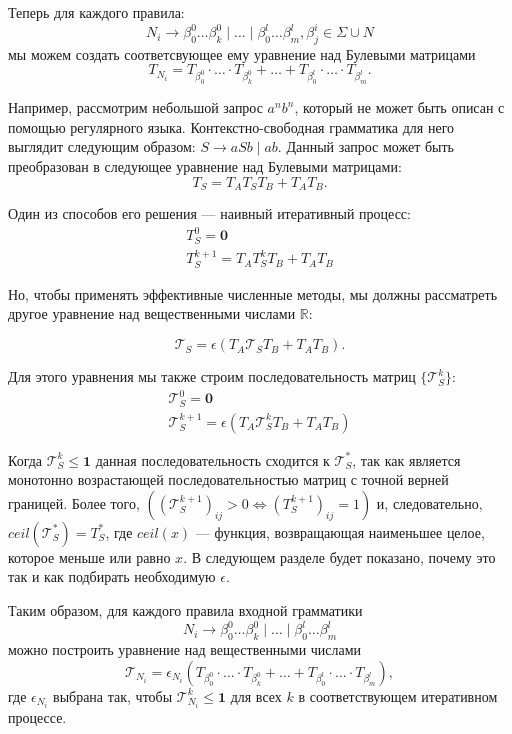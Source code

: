 \documentclass[12pt]{matmex-diploma-custom}
\begin{document}
Теперь для каждого правила:
$$N_i \to \beta^0_0 \dots \beta^0_k \mid \ldots \mid \beta^l_0 \dots \beta^l_m, \beta^i_j \in \Sigma \cup N$$
мы можем создать соответсвующее ему уравнение над Булевыми матрицами
$$T_{N_i} = T_{\beta^0_0}\cdot \ldots \cdot T_{\beta^0_k} + \ldots + T_{\beta^l_0}\cdot \ldots \cdot T_{\beta^l_m}.$$

Например, рассмотрим небольшой запрос $a^nb^n$, который не может быть описан с помощью регулярного языка. Контекстно-свободная грамматика для него выглядит следующим образом: $S \rightarrow aSb \mid ab$. 
Данный запрос может быть преобразован в следующее уравнение над Булевыми матрицами:
\begin{equation}
    T_S = T_AT_ST_B + T_AT_B.
\label{eqbool}
\end{equation}

Один из способов его решения --- наивный итеративный процесс:
\begin{gather*} 
T_S^0 = \mathbf{0} \\
T_S^{k+1} = T_A T_S^k T_B + T_A T_B
\end{gather*} 

Но, чтобы применять эффективные численные методы, мы должны рассматреть другое уравнение над вещественными числами $\mathbb{R}$:

$$\mathcal{T}_S = \epsilon(T_A \mathcal{T}_S T_B + T_A T_B).$$

Для этого уравнения мы также строим последовательность матриц $\{ \mathcal{T}_S^{k}\}$: 
\begin{gather*} 
\mathcal{T}_S^0 = \mathbf{0} \\
\mathcal{T}_S^{k+1} = \epsilon(T_A \mathcal{T}_S^k T_B + T_A T_B)
\end{gather*} 

Когда  $\mathcal{T}_S^{k} \leq \textbf{1}$ данная последовательность сходится к $\mathcal{T}_S^*$, так как является монотонно возрастающей последовательностью матриц с точной верней границей.
Более того, $((\mathcal{T}_S^{k+1})_{ij} > 0 \Leftrightarrow (T_S^{k+1})_{ij} = 1)$ и, следовательно, $ceil(\mathcal{T}_S^*) = T_S^*$, где $ceil(x)$ --- функция, возвращающая наименьшее целое, которое меньше или равно $x$. 
В следующем разделе будет показано, почему это так и как подбирать необходимую $\epsilon$.

Таким образом, для каждого правила входной грамматики
$$N_i \to \beta^0_0 \dots \beta^0_k \mid \ldots \mid \beta^l_0 \dots \beta^l_m$$
можно построить уравнение над вещественными числами
$$\mathcal{T}_{N_i} = \epsilon_{N_i}(T_{\beta^0_0}\cdot \ldots \cdot T_{\beta^0_k} + \ldots + T_{\beta^l_0}\cdot \ldots \cdot T_{\beta^l_m}), $$
где $\epsilon_{N_i}$ выбрана так, чтобы $\mathcal{T}_{N_i}^{k} \leq \textbf{1}$ для всех $k$ в соответствующем итеративном процессе.
\end{document}
